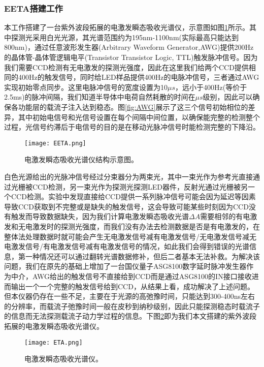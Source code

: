 \subsubsection{EETA搭建工作}
本工作搭建了一台紫外波段拓展的电激发瞬态吸收光谱仪，示意图如图\ref{fig:EETA}所示。其中探测光采用白光光源，其光谱范围约为195nm-1100nm(实际最高只能达到800nm)，通过任意波形发生器(Arbitrary Waveform Generator,AWG)提供200Hz的晶体管-晶体管逻辑电平(Transistor Transistor Logic, TTL)触发脉冲信号。因为我们需要CCD检测有无电激发的探测光强度，因此在这里我们给两个CCD提供相同的400Hz的触发信号，同时给LED样品提供400Hz的电脉冲信号，三者通过AWG实现初始零点同步。这里电脉冲信号的宽度设置为10$\mu s$，远小于400Hz(等价于2.5ms)的脉冲间隔，我们知道半导体中电荷自然耗散的时间在$\mu s$级别，因此可以确保各功能层的载流子注入达到稳态。图\ref{fig:AWG}展示了这三个信号初始相位的差异，其中初始电信号和光信号设置在每个间隔中间位置，以确保能完整的检测整个过程，光信号约滞后于电信号的目的是在移动光脉冲信号时能检测完整的下降沿。

\begin{figure}[ht]
	\centering
	\texttt{[image: EETA.png]}
	\caption{电激发瞬态吸收光谱仪结构示意图。}
	\label{fig:EETA}
\end{figure}

白色光源给出的光脉冲信号经过分束器分为两束光，其中一束光作为参考光直接通过光栅被CCD检测，另一束光作为探测光探测LED器件，反射光通过光栅被另一个CCD检测。实验中发现直接给CCD提供一系列脉冲信号可能会因为延迟等因素导致CCD获取到不完整或是缺失的触发信号，这会导致可能某些时刻因为CCD没有触发而导致数据缺失，因为我们计算电激发瞬态吸收光谱$\Delta A$需要相邻的有电激发和无电激发时的探测光强度，而我们没有办法去检测数据是否是有电激发的，在整体法处理数据时就可能会产生无电激发信号减有电激发信号/无电激发信号减无电激发信号/有电激发信号减有电激发信号的情况，如此我们会得到错误的光谱信息，第一种情况还可以通过翻转光谱数据修补，但后二者基本无法补救。为解决该问题，我们在原先的基础上增加了一台国仪量子ASG8100数字延时脉冲发生器作为中介，AWG给出的触发信号不直接给到CCD而是通过ASG8100的IN接口接收进而输出一个一个完整的触发信号给到CCD，从结果上看，成功解决了上述问题。但本仪器仍存在一些不足，主要在于光源的高弛豫时间，只能达到300-400ns左右的分辨率，而载流子弛豫时间一般在皮秒到纳秒级别，因此只能探测稳态时载流子的信息而无法探测载流子动力学过程的信息。下图\ref{fig:ETA}即为我们本文搭建的紫外波段拓展的电激发瞬态吸收光谱仪。
\begin{figure}[ht]
	\centering
	\texttt{[image: ETA.png]}
	\caption{电激发瞬态吸收光谱仪。}
	\label{fig:ETA}
\end{figure}
